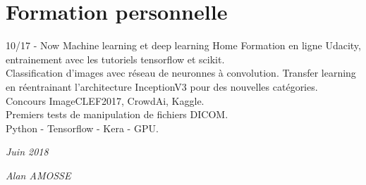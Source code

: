 \documentclass[]{friggeri-cv}
\begin{document}
\section{Formation personnelle}
\begin{entrylist}
  \entry
    {10/17 - Now}
    {Machine learning et deep learning}
    {Home}
    {Formation en ligne Udacity, entrainement avec les tutoriels tensorflow et scikit.\\
    Classification d'images avec réseau de neuronnes à convolution. Transfer learning en réentrainant l'architecture InceptionV3 pour des nouvelles catégories.\\
    Concours ImageCLEF2017, CrowdAi, Kaggle.\\
    Premiers tests de manipulation de fichiers DICOM.\\
    Python - Tensorflow - Kera - GPU.}
\end{entrylist}
\begin{flushleft}
\emph{Juin 2018}
\end{flushleft}
\begin{flushright}
\emph{Alan AMOSSE}
\end{flushright}
% 
\end{document}
